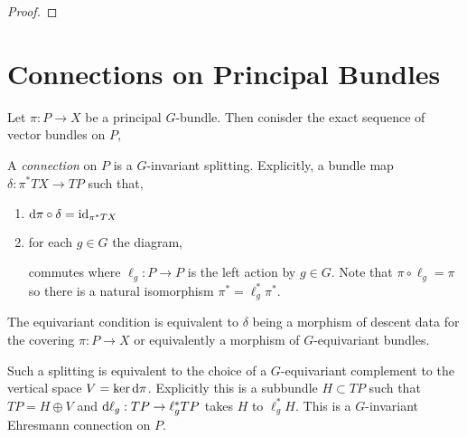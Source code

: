 \documentclass[12pt]{extarticle}
\begin{document}
\begin{proof}

\end{proof}

\section{Connections on Principal Bundles}

\begin{defn}
Let $\pi : P \to X$ be a principal $G$-bundle. Then conisder the exact sequence of vector bundles on $P$,
\begin{center}
\end{center}
A \textit{connection} on $P$ is a $G$-invariant splitting. Explicitly, a bundle map $\delta : \pi^* TX \to TP$ such that,
\begin{enumerate}
\item $\mathrm{d}{\pi} \circ \delta = \mathrm{id}_{\pi^* TX}$
\item for each $g \in G$ the diagram,
\begin{center}
\end{center} 
commutes where $\ell_g : P \to P$ is the left action by $g \in G$. Note that $\pi \circ \ell_g = \pi$ so there is a natural isomorphism $\pi^* = \ell_g^* \pi^*$.
\end{enumerate}
\end{defn}

\begin{rmk}
The equivariant condition is equivalent to $\delta$ being a morphism of descent data for the covering $\pi : P \to X$ or equivalently a morphism of $G$-equivariant bundles.
\end{rmk}

\begin{rmk}
Such a splitting is equivalent to the choice of a $G$-equivariant complement to the vertical space $V = \ker{\mathrm{d}{\pi}}$. Explicitly this is a subbundle $H \subset TP$ such that $TP = H \oplus V$ and $\mathrm{d}{\ell_g} : TP \to \ell_g^* TP$ takes $H$ to $\ell_g^* H$. This is a $G$-invariant Ehresmann connection on $P$.
\end{rmk}
\end{document}
